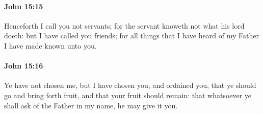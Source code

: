 		\paragraph{John 15:15} %
			\label{JOHN-15-15}

			Henceforth I call you not servants; for the servant knoweth not what his lord doeth: but I have called you friends; for all things that I have heard of my Father I have made known unto you.

			\begin{framed}
				\scriptsize
				\begin{compactdesc}
					\item[SBLG] 
				\end{compactdesc}
			\end{framed}

		\paragraph{John 15:16} %
			\label{JOHN-15-16}

			Ye have not chosen me, but I have chosen you, and ordained you, that ye should go and bring forth fruit, and that your fruit should remain: that whatsoever ye shall ask of the Father in my name, he may give it you.

